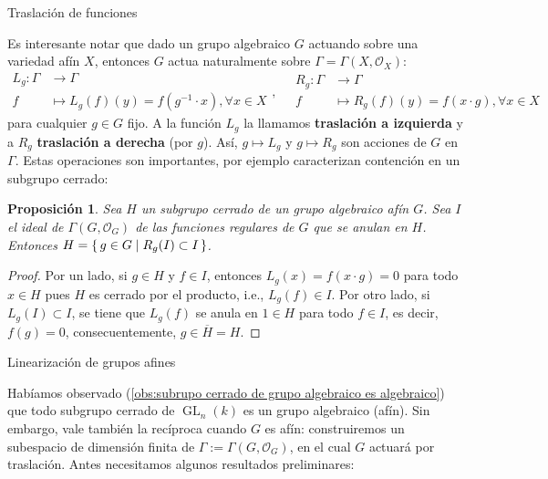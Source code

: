 \documentclass[spanish,10pt]{amsart}
\makeatletter
\renewcommand\subsection{\@startsection{subsection}{2}%
  \z@{.5\linespacing\@plus.7\linespacing}{-.5em}%
  {\normalfont\sffamily}}
\newtheorem{proposition}[theorem]{Proposición}
\theoremstyle{definition}
\theoremstyle{remark}
\numberwithin{equation}{section}
\renewcommand{\bar}[1]{\overline{#1}}
\renewcommand{\O}{\mathcal{O}}
\makeatother
\begin{document}
\subsection{Traslación de funciones}

Es interesante notar que dado un grupo algebraico $G$ actuando sobre una variedad afín $X$, entonces $G$ actua naturalmente sobre $\Gamma = \Gamma (X, \O_X)$:
\[
    \begin{array}{rl}
    L_g : \Gamma &\longrightarrow \Gamma \\
f &\longmapsto L_g (f) (y) = f(g^{-1} \cdot x) , \forall x \in X
    \end{array}, \quad
    \begin{array}{rl}
    R_g : \Gamma &\longrightarrow \Gamma \\
f &\longmapsto R_g (f) (y) = f(x \cdot g) , \forall x \in X
    \end{array}
\]
para cualquier $g \in G$ fijo. A la función $L_g$ la llamamos \textbf{traslación a izquierda} y a $R_g$ \textbf{traslación a derecha} (por $g$). Así, $g \mapsto L_g$ y $g \mapsto R_g$ son acciones de $G$ en $\Gamma$. Estas operaciones son importantes, por ejemplo caracterizan contención en un subgrupo cerrado:

\begin{proposition}
Sea $H$ un subgrupo cerrado de un grupo algebraico afín $G$. Sea $I$ el ideal de $\Gamma (G, \O_G)$ de las funciones regulares de $G$ que se anulan en $H$. Entonces $H = \set{g \in G | R_g (I) \subset I}$.
\end{proposition}
\begin{proof}
Por un lado, si $g \in H$ y $f \in I$, entonces $L_g (x) = f(x \cdot g) = 0$ para todo $x \in H$ pues $H$ es cerrado por el producto, i.e., $L_g (f) \in I$. Por otro lado, si $L_g (I) \subset I$, se tiene que $L_g (f)$ se anula en $1 \in H$ para todo $f \in I$, es decir, $f(g) = 0$, consecuentemente, $g \in \bar H = H$.
\end{proof}



\subsection{Linearización de grupos afines}

Habíamos observado (\ref{obs:subrupo cerrado de grupo algebraico es algebraico}) que todo subgrupo cerrado de $\operatorname{GL}_n (k)$ es un grupo algebraico (afín). Sin embargo, vale también la recíproca cuando $G$ es afín: construiremos un subespacio de dimensión finita de $\Gamma := \Gamma (G, \O_G)$, en el cual $G$ actuará por traslación. Antes necesitamos algunos resultados preliminares:
\end{document}
